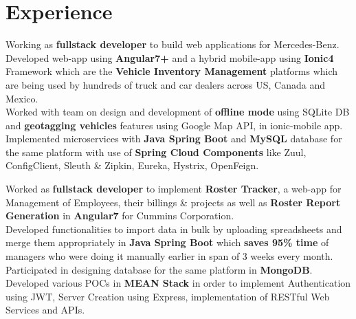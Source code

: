 \documentclass[]{jaydeep-resume-openfont}
\begin{document}
\begin{minipage}[t]{0.70\textwidth}


\section{Experience}

\textbullet{} Working as \textbf{fullstack developer} to build web applications for Mercedes-Benz. \\
\textbullet{} Developed web-app using \textbf{Angular7+} and a hybrid mobile-app using \textbf{Ionic4} Framework which are the \textbf{Vehicle Inventory Management} platforms which are being used by hundreds of truck and car dealers across US, Canada and Mexico.\\
\textbullet{} Worked with team on design and development of \textbf{offline mode} using SQLite DB and \textbf{geotagging vehicles} features using Google Map API, in ionic-mobile app. \\
\textbullet{} Implemented microservices with \textbf{Java Spring Boot} and \textbf{MySQL} database for the same platform with use of \textbf{Spring Cloud Components} like Zuul, ConfigClient, Sleuth \& Zipkin, Eureka, Hystrix, OpenFeign.
\sectionsep

\textbullet{} Worked as \textbf{fullstack developer} to implement \textbf{Roster Tracker}, a web-app for Management of Employees, their billings \& projects as well as \textbf{Roster Report Generation} in \textbf{Angular7} for Cummins Corporation. \\
\textbullet{} Developed functionalities to import data in bulk by uploading spreadsheets and merge them appropriately in \textbf{Java Spring Boot} which \textbf{saves 95\% time} of managers who were doing it manually earlier in span of 3 weeks every month. \\
\textbullet{} Participated in designing database for the same platform in \textbf{MongoDB}. \\
\textbullet{} Developed various POCs in \textbf{MEAN Stack} in order to implement Authentication using JWT, Server Creation using Express, implementation of RESTful Web Services and APIs. \\
\sectionsep


\end{minipage}
\end{document}
